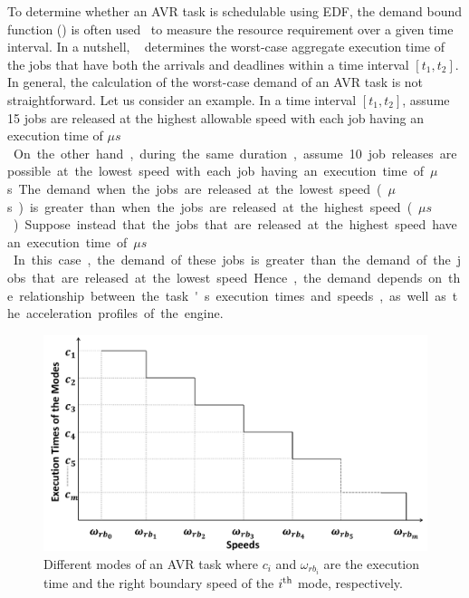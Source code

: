 To determine whether an AVR task is schedulable using EDF, the demand bound function (\dbf) is often used~\cite{biondi_response-time_2015,biondi_feasibility_2015} to measure the resource requirement over a given time interval. In a nutshell, \dbf~ determines the worst-case aggregate execution time of the jobs that have both the arrivals and deadlines within a time interval $[t_1,t_2]$.
In general, the calculation of the worst-case demand of an AVR task is not straightforward.
Let us consider an example.
In a time interval $[t_1,t_2]$, assume 15 jobs are released at the highest allowable speed with each job having an execution time of \unit[50]{$\mu s$}.
On the other hand, during the same duration, assume 10 job releases are possible at the lowest speed with each job having an execution time of \unit[100]{$\mu$s}.
The demand when the jobs are released at the lowest speed (\unit[1,000]{$\mu$s}) is greater than when the jobs are released at the highest speed (\unit[750]{$\mu s$}).
Suppose instead that the jobs that are released at the highest speed have an execution time of \unit[70]{$\mu s$}.
In this case, the demand of these jobs is greater than the demand of the jobs that are released at the lowest speed. 
Hence, the demand depends on the relationship between the task's execution times and speeds, as well as the acceleration profiles of the engine.  

\begin{figure}
\centering
\includegraphics[width=\linewidth]{fig/AVRImage.pdf}
\caption{Different modes of an AVR task where $c_i$ and $\omega_{rb_i}$ are the execution time and the right boundary speed of the $i^{\rm th}$ mode, respectively.}
\label{fig:AVRImage}
\end{figure}

